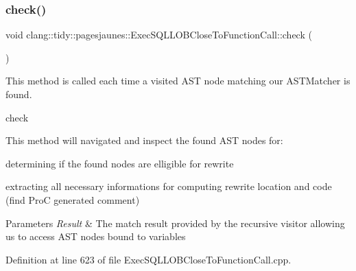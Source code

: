 \subsubsection{\texorpdfstring{check()}{check()}}
{\footnotesize\ttfamily void clang\+::tidy\+::pagesjaunes\+::\+Exec\+S\+Q\+L\+L\+O\+B\+Close\+To\+Function\+Call\+::check (\begin{DoxyParamCaption}\item[{const ast\+\_\+matchers\+::\+Match\+Finder\+::\+Match\+Result \&}]{ }\end{DoxyParamCaption})\hspace{0.3cm}{\ttfamily [override]}}



This method is called each time a visited A\+ST node matching our A\+S\+T\+Matcher is found. 

check

This method will navigated and inspect the found A\+ST nodes for\+:
\begin{DoxyItemize}
\item determining if the found nodes are elligible for rewrite
\item extracting all necessary informations for computing rewrite location and code (find ProC generated comment)
\end{DoxyItemize}


\begin{DoxyParams}{Parameters}
{\em Result} & The match result provided by the recursive visitor allowing us to access A\+ST nodes bound to variables \\
\hline
\end{DoxyParams}


Definition at line 623 of file Exec\+S\+Q\+L\+L\+O\+B\+Close\+To\+Function\+Call.\+cpp.

\mbox{\label{classclang_1_1tidy_1_1pagesjaunes_1_1_exec_s_q_l_l_o_b_close_to_function_call_ac67efcc243c9d7907d70c1f01cb08a63}} 

